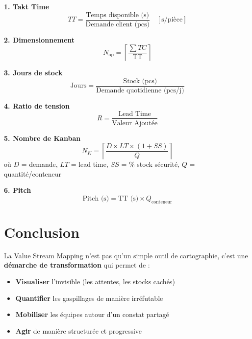 \documentclass[12pt,a4paper]{article}
\begin{document}
\begin{tcolorbox}[colback=uimmblue!10, colframe=uimmblue, title=Formulaire VSM]

\textbf{1. Takt Time}
\begin{equation*}
    TT = \frac{\text{Temps disponible (s)}}{\text{Demande client (pcs)}} \quad [\text{s/pièce}]
\end{equation*}

\textbf{2. Dimensionnement}
\begin{equation*}
    N_{\text{op}} = \left\lceil \frac{\sum TC}{\text{TT}} \right\rceil
\end{equation*}

\textbf{3. Jours de stock}
\begin{equation*}
    \text{Jours} = \frac{\text{Stock (pcs)}}{\text{Demande quotidienne (pcs/j)}}
\end{equation*}

\textbf{4. Ratio de tension}
\begin{equation*}
    R = \frac{\text{Lead Time}}{\text{Valeur Ajoutée}}
\end{equation*}

\textbf{5. Nombre de Kanban}
\begin{equation*}
    N_K = \left\lceil \frac{D \times LT \times (1 + SS)}{Q} \right\rceil
\end{equation*}
où $D$ = demande, $LT$ = lead time, $SS$ = \% stock sécurité, $Q$ = quantité/conteneur

\textbf{6. Pitch}
\begin{equation*}
    \text{Pitch (s)} = \text{TT (s)} \times Q_{\text{conteneur}}
\end{equation*}

\end{tcolorbox}

\newpage

\section{Conclusion}

La Value Stream Mapping n'est pas qu'un simple outil de cartographie, c'est une \textbf{démarche de transformation} qui permet de :

\begin{itemize}[leftmargin=*]
    \item \textbf{Visualiser} l'invisible (les attentes, les stocks cachés)
    \item \textbf{Quantifier} les gaspillages de manière irréfutable
    \item \textbf{Mobiliser} les équipes autour d'un constat partagé
    \item \textbf{Agir} de manière structurée et progressive
\end{itemize}
\end{document}

